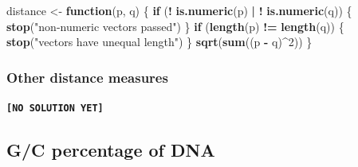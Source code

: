\documentclass[]{book}
\newenvironment{Shaded}{\begin{snugshade}}{\end{snugshade}}
\newcommand{\ControlFlowTok}[1]{\textcolor[rgb]{0.13,0.29,0.53}{\textbf{#1}}}
\newcommand{\DecValTok}[1]{\textcolor[rgb]{0.00,0.00,0.81}{#1}}
\newcommand{\KeywordTok}[1]{\textcolor[rgb]{0.13,0.29,0.53}{\textbf{#1}}}
\newcommand{\NormalTok}[1]{#1}
\newcommand{\OperatorTok}[1]{\textcolor[rgb]{0.81,0.36,0.00}{\textbf{#1}}}
\newcommand{\StringTok}[1]{\textcolor[rgb]{0.31,0.60,0.02}{#1}}
\begin{document}
\begin{Shaded}
\begin{Highlighting}[]
\NormalTok{distance <-}\StringTok{ }\ControlFlowTok{function}\NormalTok{(p, q) \{}
    \ControlFlowTok{if}\NormalTok{ (}\OperatorTok{!}\StringTok{ }\KeywordTok{is.numeric}\NormalTok{(p) }\OperatorTok{|}\StringTok{ }\OperatorTok{!}\StringTok{ }\KeywordTok{is.numeric}\NormalTok{(q)) \{}
        \KeywordTok{stop}\NormalTok{(}\StringTok{"non-numeric vectors passed"}\NormalTok{)}
\NormalTok{    \}}
    \ControlFlowTok{if}\NormalTok{ (}\KeywordTok{length}\NormalTok{(p) }\OperatorTok{!=}\StringTok{ }\KeywordTok{length}\NormalTok{(q)) \{}
        \KeywordTok{stop}\NormalTok{(}\StringTok{"vectors have unequal length"}\NormalTok{)}
\NormalTok{    \}}
    \KeywordTok{sqrt}\NormalTok{(}\KeywordTok{sum}\NormalTok{((p }\OperatorTok{-}\StringTok{ }\NormalTok{q)}\OperatorTok{^}\DecValTok{2}\NormalTok{))}
\NormalTok{\}}
\end{Highlighting}
\end{Shaded}

\hypertarget{other-distance-measures-1}{%
\subsubsection*{Other distance measures}\label{other-distance-measures-1}}

\textbf{\texttt{{[}NO\ SOLUTION\ YET{]}}}

\hypertarget{gc-percentage-of-dna-1}{%
\subsection{G/C percentage of DNA}\label{gc-percentage-of-dna-1}}
\end{document}
